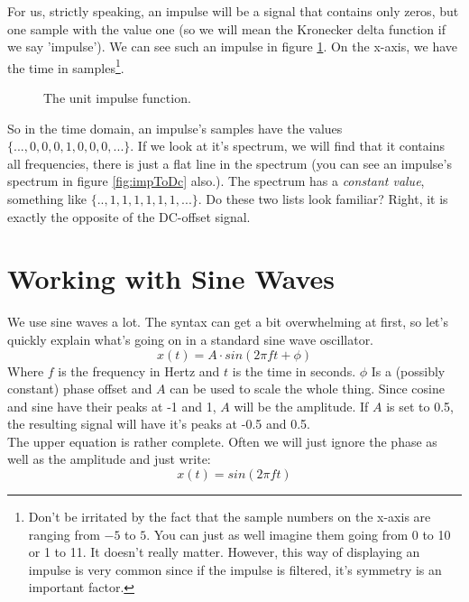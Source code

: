 For us, strictly speaking, an impulse will be a signal that contains only zeros, but one sample with the value one (so we will mean the Kronecker delta function if we say 'impulse'). We can see such an impulse in figure \ref{fig:unitImpulse}. On the x-axis, we have the time in samples\footnote{Don't be irritated by the fact that the sample numbers on the x-axis are ranging from $-5$ to $5$. You can just as well imagine them going from 0 to 10 or 1 to 11. It doesn't really matter. However, this way of displaying an impulse is very common since if the impulse is filtered, it's symmetry is an important factor.}.


\begin{figure}[H]
	\begin{center}
		
		\caption{The unit impulse function.}
		\label{fig:unitImpulse}
	\end{center}
\end{figure}

So in the time domain, an impulse's samples have the values $\{...,0,0,0,1,0,0,0,...\}$. If we look at it's spectrum, we will find that it contains all frequencies, there is just a flat line in the spectrum (you can see an impulse's spectrum in figure \ref{fig:impToDc} also.). The spectrum has a \textit{constant value}, something like $\{..,1,1,1,1,1,1,...\}$. Do these two lists look familiar? Right, it is exactly the opposite of the DC-offset signal.




\section{Working with Sine Waves}
We use sine waves a lot. The syntax can get a bit overwhelming at first, so let's quickly explain what's going on in a standard sine wave oscillator.
\begin{equation}
	x(t) = A \cdot sin(2\pi f t + \phi)
\end{equation}
Where $f$ is the frequency in Hertz and $t$ is the time in seconds. $\phi$ Is a (possibly constant) phase offset and $A$ can be used to scale the whole thing. Since cosine and sine have their peaks at -1 and 1, $A$ will be the amplitude. If $A$ is set to 0.5, the resulting signal will have it's peaks at -0.5 and 0.5. \\
The upper equation is rather complete. Often we will just ignore the phase as well as the amplitude and just write:
\begin{equation}
	x(t) = sin(2\pi f t )
\end{equation}

